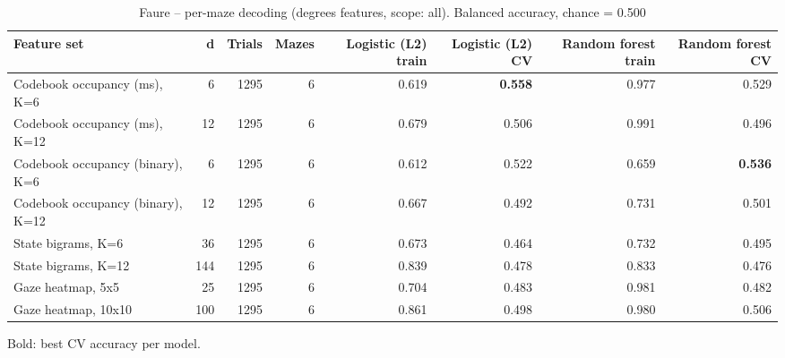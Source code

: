 \begin{table}[t]
\centering
\caption{Faure -- per-maze decoding (degrees features, scope: all). Balanced accuracy, chance = 0.500}
\label{tab:permaze_Faure}
\begin{tabular}{lrrrrrrr}
\toprule
Feature set & d & Trials & Mazes & Logistic (L2) train & Logistic (L2) CV & Random forest train & Random forest CV \\
\midrule
Codebook occupancy (ms), K=6 & 6 & 1295 & 6 & 0.619 & \textbf{0.558} & 0.977 & 0.529 \\
Codebook occupancy (ms), K=12 & 12 & 1295 & 6 & 0.679 & 0.506 & 0.991 & 0.496 \\
Codebook occupancy (binary), K=6 & 6 & 1295 & 6 & 0.612 & 0.522 & 0.659 & \textbf{0.536} \\
Codebook occupancy (binary), K=12 & 12 & 1295 & 6 & 0.667 & 0.492 & 0.731 & 0.501 \\
State bigrams, K=6 & 36 & 1295 & 6 & 0.673 & 0.464 & 0.732 & 0.495 \\
State bigrams, K=12 & 144 & 1295 & 6 & 0.839 & 0.478 & 0.833 & 0.476 \\
Gaze heatmap, 5x5 & 25 & 1295 & 6 & 0.704 & 0.483 & 0.981 & 0.482 \\
Gaze heatmap, 10x10 & 100 & 1295 & 6 & 0.861 & 0.498 & 0.980 & 0.506 \\
\bottomrule
\end{tabular}
\par\smallskip
{\footnotesize Bold: best CV accuracy per model.}
\end{table}
